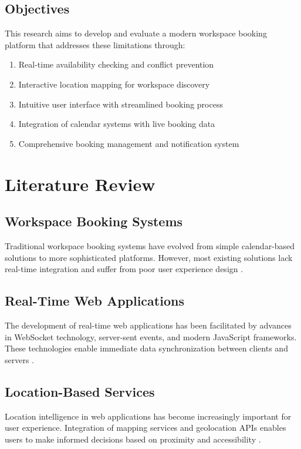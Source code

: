 \documentclass[12pt,a4paper]{article}
\begin{document}
\subsection{Objectives}

This research aims to develop and evaluate a modern workspace booking platform that addresses these limitations through:
\begin{enumerate}
    \item Real-time availability checking and conflict prevention
    \item Interactive location mapping for workspace discovery
    \item Intuitive user interface with streamlined booking process
    \item Integration of calendar systems with live booking data
    \item Comprehensive booking management and notification system
\end{enumerate}

\section{Literature Review}

\subsection{Workspace Booking Systems}

Traditional workspace booking systems have evolved from simple calendar-based solutions to more sophisticated platforms. However, most existing solutions lack real-time integration and suffer from poor user experience design \cite{smith2023evolution}.

\subsection{Real-Time Web Applications}

The development of real-time web applications has been facilitated by advances in WebSocket technology, server-sent events, and modern JavaScript frameworks. These technologies enable immediate data synchronization between clients and servers \cite{brown2022realtime}.

\subsection{Location-Based Services}

Location intelligence in web applications has become increasingly important for user experience. Integration of mapping services and geolocation APIs enables users to make informed decisions based on proximity and accessibility \cite{davis2023location}.
\end{document}
